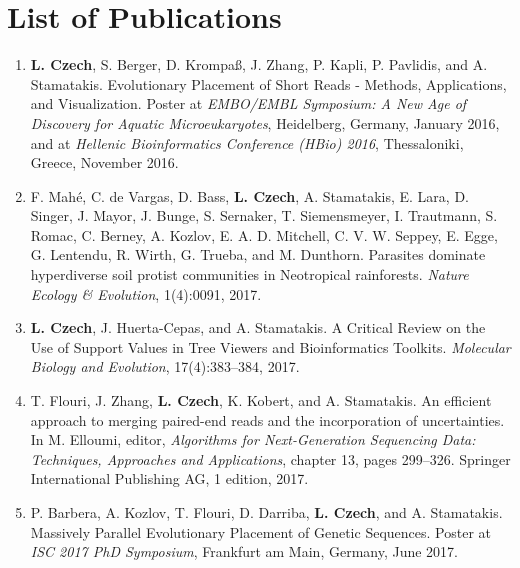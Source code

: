\cleardoublepage

\chapter{List of Publications}
\label{ch:Publications}


\begin{enumerate}
    \item \textbf{L. Czech}, S. Berger, D. Krompaß, J. Zhang, P. Kapli, P. Pavlidis, and A. Stamatakis.
        Evolutionary Placement of Short Reads - Methods, Applications, and Visualization.
        Poster at \textit{EMBO/EMBL Symposium: A New Age of Discovery for Aquatic Microeukaryotes}, Heidelberg, Germany, January 2016,
        and at \textit{Hellenic Bioinformatics Conference (HBio) 2016}, Thessaloniki, Greece, November 2016.

    \item F. Mah{\'{e}}, C. de Vargas, D. Bass, \textbf{L. Czech}, A. Stamatakis, E. Lara, D. Singer, J. Mayor, J. Bunge,
        S. Sernaker, T. Siemensmeyer, I. Trautmann, S. Romac, C. Berney, A. Kozlov, E. A. D. Mitchell, C. V. W. Seppey,
        E. Egge, G. Lentendu, R. Wirth, G. Trueba, and M. Dunthorn.
        Parasites dominate hyperdiverse soil protist communities in Neotropical rainforests.
        \textit{Nature Ecology \& Evolution}, 1(4):0091, 2017. \cite{Mahe2017}

    \item \textbf{L. Czech}, J. Huerta-Cepas, and A. Stamatakis.
        A Critical Review on the Use of Support Values in Tree Viewers and Bioinformatics Toolkits.
        \textit{Molecular Biology and Evolution}, 17(4):383--384, 2017. \cite{Czech2017}

    \item T. Flouri, J. Zhang, \textbf{L. Czech}, K. Kobert, and A. Stamatakis.
        An efficient approach to merging paired-end reads and the incorporation of uncertainties.
        In M. Elloumi, editor, \textit{Algorithms for Next-Generation Sequencing Data: Techniques, Approaches and Applications},
        chapter 13, pages 299--326. Springer International Publishing AG, 1 edition, 2017. \cite{Flouri2017}

    \item P. Barbera, A. Kozlov, T. Flouri, D. Darriba, \textbf{L. Czech}, and A. Stamatakis.
        Massively Parallel Evolutionary Placement of Genetic Sequences.
        Poster at \textit{ISC 2017 PhD Symposium}, Frankfurt am Main, Germany, June 2017.


\end{enumerate}
